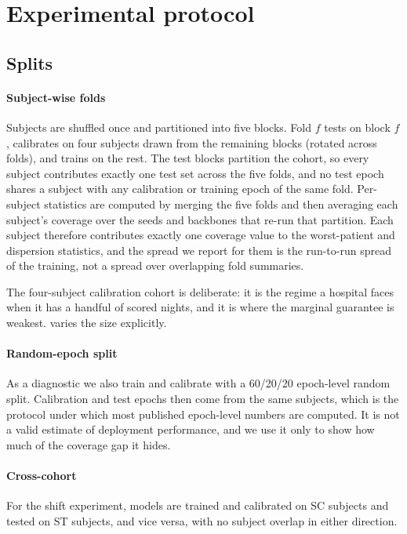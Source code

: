 \section{Experimental protocol}
\label{sec:setup}

\subsection{Splits}
\label{sec:splits}

\paragraph{Subject-wise folds}
Subjects are shuffled once and partitioned into five blocks. Fold $f$ tests
on block $f$, calibrates on four subjects drawn from the remaining blocks
(rotated across folds), and trains on the rest. The test blocks partition the
cohort, so every subject contributes exactly one test set across the five
folds, and no test epoch shares a subject with any calibration or training
epoch of the same fold. Per-subject statistics are computed by merging the
five folds and then averaging each subject's coverage over the seeds and
backbones that re-run that partition. Each subject therefore contributes
exactly one coverage value to the worst-patient and dispersion statistics,
and the spread we report for them is the run-to-run spread of the training,
not a spread over overlapping fold summaries.

The four-subject calibration cohort is deliberate: it is the regime a
hospital faces when it has a handful of scored nights, and it is where the
marginal guarantee is weakest.  varies the size
explicitly.

\paragraph{Random-epoch split}
As a diagnostic we also train and calibrate with a 60/20/20 epoch-level
random split. Calibration and test epochs then come from the same subjects,
which is the protocol under which most published epoch-level numbers are
computed. It is not a valid estimate of deployment performance, and we use it
only to show how much of the coverage gap it hides.

\paragraph{Cross-cohort}
For the shift experiment, models are trained and calibrated on SC subjects
and tested on ST subjects, and vice versa, with no subject overlap in either
direction.

